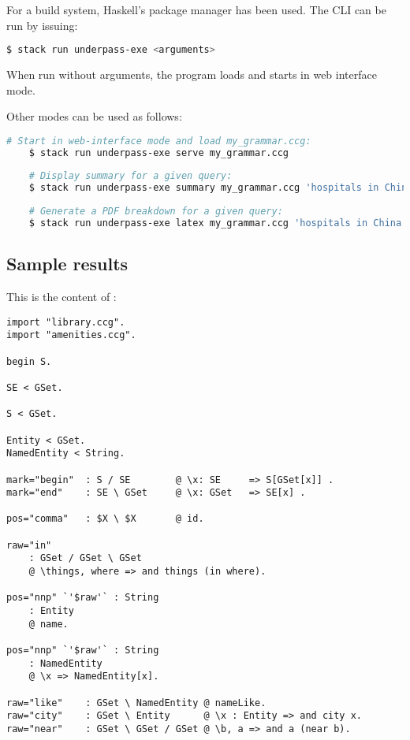 \documentclass[main.tex]{subfiles}
\begin{document}

For a build system, Haskell's  package manager has been used. The
CLI can be run by issuing:
\begin{lstlisting}[language=bash]
    $ stack run underpass-exe <arguments>
\end{lstlisting}

When run without arguments, the program loads 
and starts in web interface mode.

Other modes can be used as follows:
\begin{lstlisting}[language=bash]
    # Start in web-interface mode and load my_grammar.ccg:
    $ stack run underpass-exe serve my_grammar.ccg
    
    # Display summary for a given query:
    $ stack run underpass-exe summary my_grammar.ccg 'hospitals in China'
    
    # Generate a PDF breakdown for a given query:
    $ stack run underpass-exe latex my_grammar.ccg 'hospitals in China'
\end{lstlisting}


\subsection{Sample results}
This is the content of :
\begin{lstlisting}
import "library.ccg".
import "amenities.ccg".

begin S.

SE < GSet.

S < GSet.

Entity < GSet.
NamedEntity < String.

mark="begin"  : S / SE        @ \x: SE     => S[GSet[x]] .
mark="end"    : SE \ GSet     @ \x: GSet   => SE[x] .

pos="comma"   : $X \ $X       @ id.

raw="in"      
    : GSet / GSet \ GSet 
    @ \things, where => and things (in where).

pos="nnp" `'$raw'` : String
    : Entity          
    @ name.

pos="nnp" `'$raw'` : String
    : NamedEntity       
    @ \x => NamedEntity[x].

raw="like"    : GSet \ NamedEntity @ nameLike.
raw="city"    : GSet \ Entity      @ \x : Entity => and city x.
raw="near"    : GSet \ GSet / GSet @ \b, a => and a (near b).
\end{lstlisting}
\end{document}
